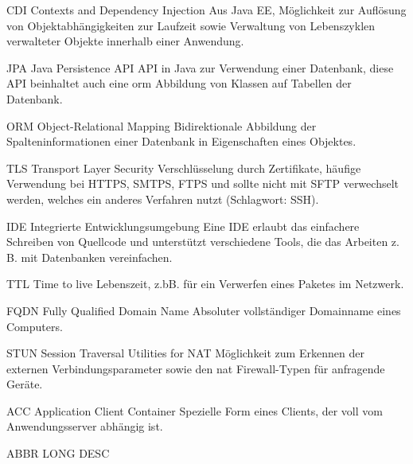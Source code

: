  
{CDI}            %
{Contexts and Dependency Injection}  %
{Aus Java EE, Möglichkeit zur Auflösung von Objektabhängigkeiten zur Laufzeit sowie Verwaltung von Lebenszyklen verwalteter Objekte innerhalb einer Anwendung.} %

{JPA}            %
{Java Persistence API}  %
{API in Java zur Verwendung einer Datenbank, diese API beinhaltet auch eine \acrshort{orm} Abbildung von Klassen auf Tabellen der Datenbank.} %
 
{ORM}            %
{Object-Relational Mapping}  %
{Bidirektionale Abbildung der Spalteninformationen einer Datenbank in Eigenschaften eines Objektes.} %

{TLS}            %
{Transport Layer Security}  %
{Verschlüsselung durch Zertifikate, häufige Verwendung bei HTTPS, SMTPS, FTPS und sollte nicht mit SFTP verwechselt werden, welches ein anderes Verfahren nutzt (Schlagwort: SSH).} %
 

{IDE}            %
{Integrierte Entwicklungsumgebung}  %
{Eine IDE erlaubt das einfachere Schreiben von Quellcode und unterstützt verschiedene Tools, die das Arbeiten z. B. mit Datenbanken vereinfachen.} %




{TTL}            %
{Time to live}  %
{Lebenszeit, z.bB. für ein Verwerfen eines Paketes im Netzwerk.} %


 
{FQDN}            %
{Fully Qualified Domain Name}  %
{Absoluter vollständiger Domainname eines Computers.} %
  
 
 
 
 {STUN}            %
 {Session Traversal Utilities for NAT}  %
 {Möglichkeit zum Erkennen der externen Verbindungsparameter sowie den \acrshort{nat} Firewall-Typen für anfragende Geräte.} %
 
  
 
 {ACC}            %
 {Application Client Container}  %
 {Spezielle Form eines Clients, der voll vom Anwendungsserver abhängig ist.} %
 
 {ABBR}            %
 {LONG}  %
 {DESC} %
 
 
 
 